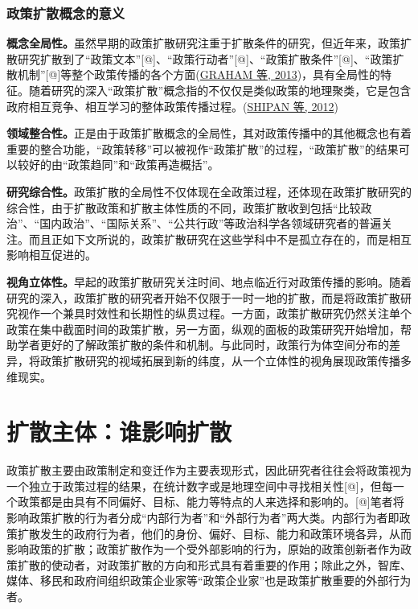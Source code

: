 \documentclass[
  12pt,
]{ctexart}
\begin{document}
\hypertarget{ux653fux7b56ux6269ux6563ux6982ux5ff5ux7684ux610fux4e49}{%
\subsubsection{政策扩散概念的意义}\label{ux653fux7b56ux6269ux6563ux6982ux5ff5ux7684ux610fux4e49}}

\textbf{概念全局性。}虽然早期的政策扩散研究注重于扩散条件的研究，但近年来，政策扩散研究扩散到了``政策文本''{[}@{]}、``政策行动者''{[}@{]}、``政策扩散条件''{[}@{]}、``政策扩散机制''{[}@{]}等整个政策传播的各个方面(\protect\hyperlink{ref-GrahamEtAl2013}{GRAHAM 等, 2013})，具有全局性的特征。随着研究的深入``政策扩散''概念指的不仅仅是类似政策的地理聚类，它是包含政府相互竞争、相互学习的整体政策传播过程。(\protect\hyperlink{ref-ShipanVolden2012}{SHIPAN 等, 2012})

\textbf{领域整合性。}正是由于政策扩散概念的全局性，其对政策传播中的其他概念也有着重要的整合功能，``政策转移''可以被视作``政策扩散''的过程，``政策扩散''的结果可以较好的由``政策趋同''和``政策再造概括''。

\textbf{研究综合性。}政策扩散的全局性不仅体现在全政策过程，还体现在政策扩散研究的综合性，由于扩散政策和扩散主体性质的不同，政策扩散收到包括``比较政治''、``国内政治''、``国际关系''、``公共行政''等政治科学各领域研究者的普遍关注。而且正如下文所说的，政策扩散研究在这些学科中不是孤立存在的，而是相互影响相互促进的。

\textbf{视角立体性。}早起的政策扩散研究关注时间、地点临近行对政策传播的影响。随着研究的深入，政策扩散的研究者开始不仅限于一时一地的扩散，而是将政策扩散研究视作一个兼具时效性和长期性的纵贯过程。一方面，政策扩散研究仍然关注单个政策在集中截面时间的政策扩散，另一方面，纵观的面板的政策研究开始增加，帮助学者更好的了解政策扩散的条件和机制。与此同时，政策行为体空间分布的差异，将政策扩散研究的视域拓展到新的纬度，从一个立体性的视角展现政策传播多维现实。

\hypertarget{ux6269ux6563ux4e3bux4f53ux8c01ux5f71ux54cdux6269ux6563}{%
\section{扩散主体：谁影响扩散}\label{ux6269ux6563ux4e3bux4f53ux8c01ux5f71ux54cdux6269ux6563}}

政策扩散主要由政策制定和变迁作为主要表现形式，因此研究者往往会将政策视为一个独立于政策过程的结果，在统计数字或是地理空间中寻找相关性{[}@{]}，但每一个政策都是由具有不同偏好、目标、能力等特点的人来选择和影响的。{[}@{]}笔者将影响政策扩散的行为者分成``内部行为者''和``外部行为者''两大类。内部行为者即政策扩散发生的政府行为者，他们的身份、偏好、目标、能力和政策环境各异，从而影响政策的扩散；政策扩散作为一个受外部影响的行为，原始的政策创新者作为政策扩散的使动者，对政策扩散的方向和形式具有着重要的作用；除此之外，智库、媒体、移民和政府间组织政策企业家等``政策企业家''也是政策扩散重要的外部行为者。
\end{document}
